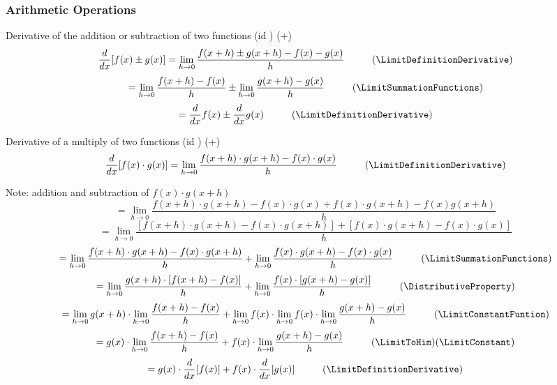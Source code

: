 \documentclass{book}
\begin{document}
                \subsubsection{Arithmetic Operations}
                    Derivative of the addition or subtraction of two functions (id \DerivativeAdditionFunction) (+)
                    \[\frac{d}{dx} [f(x) \pm g(x)] = \lim_{h \rightarrow 0} \frac{f(x + h) \pm g(x + h) - f(x) -g(x)}{h} \hspace{1cm} (\LimitDefinitionDerivative)\]
                    \[= \lim_{h \rightarrow 0} \frac{f(x + h) - f(x)}{h} \pm \lim_{h \rightarrow 0} \frac{g(x + h) - g(x)}{h} \hspace{1cm} (\LimitSummationFunctions)\]
                    \[= \frac{d}{dx} f(x) \pm \frac{d}{dx} g(x) \hspace{1cm} (\LimitDefinitionDerivative)\]
    
                    Derivative of a multiply of two functions (id \DerivativeMultiplyFunctions) (+)
                    \[\frac{d}{dx} [f(x) \cdot g(x)] = \lim_{h \rightarrow 0} \frac{f(x + h) \cdot g(x + h) - f(x) \cdot g(x)}{h} \hspace{1cm} (\LimitDefinitionDerivative)\]

                    Note: addition and subtraction of $f(x) \cdot g(x + h)$
                    \[= \lim_{h \rightarrow 0} \frac{f(x + h) \cdot g(x + h) - f(x) \cdot g(x) + f(x) \cdot g(x + h) - f(x) g(x + h)}{h}\]
                    \[= \lim_{h \rightarrow 0} \frac{[f(x + h) \cdot g(x + h) - f(x) \cdot g(x + h)] + [f(x) \cdot g(x + h) - f(x) \cdot g(x)]}{h}\]
                    \[= \lim_{h \rightarrow 0} \frac{f(x + h) \cdot g(x + h) - f(x) \cdot g(x + h)}{h} + \lim_{h \rightarrow 0} \frac{f(x) \cdot g(x + h) - f(x) \cdot g(x)}{h} \hspace{1cm} (\LimitSummationFunctions)\]
                    \[= \lim_{h \rightarrow 0} \frac{g(x + h) \cdot [f(x + h) - f(x)]}{h} + \lim_{h \rightarrow 0} \frac{f(x) \cdot [g(x + h) - g(x)]}{h} \hspace{1cm} (\DistributiveProperty)\]
                    \[= \lim_{h \rightarrow 0} g(x + h) \cdot \lim_{h \rightarrow 0}\frac{f(x + h) - f(x)}{h} + \lim_{h \rightarrow 0} f(x) \cdot \lim_{h \rightarrow 0} f(x) \cdot \lim_{h \rightarrow 0} \frac{g(x + h) - g(x)}{h} \hspace{1cm} (\LimitConstantFuntion)\]
                    \[= g(x) \cdot \lim_{h \rightarrow 0} \frac{f(x + h) - f(x)}{h} + f(x) \cdot \lim_{h \rightarrow 0} \frac{g(x + h) - g(x)}{h} \hspace{1cm} (\LimitToHim) (\LimitConstant)\]
                    \[= g(x) \cdot \frac{d}{dx} [f(x)] + f(x) \cdot \frac{d}{dx} [g(x)] \hspace{1cm} (\LimitDefinitionDerivative)\]                    
\end{document}
